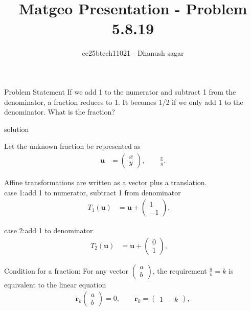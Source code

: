\documentclass{beamer}
\title{Matgeo Presentation - Problem 5.8.19}
\author{ee25btech11021 - Dhanush sagar}
\numberwithin{equation}{section}
\theoremstyle{remark}
\newcommand{\myvec}[1]{\ensuremath{\begin{pmatrix}#1\end{pmatrix}}}
\let\vec\mathbf
\begin{document}
	

		




\begin{frame}
  \titlepage
\end{frame}

\begin{frame}{Problem Statement}
If we add 1 to the numerator and subtract 1 from the denominator, a fraction reduces
to 1. It becomes 1/2 if we only add 1 to the denominator. What is the fraction?
\end{frame}

\begin{frame}{solution}

Let the unknown fraction be represented as
\begin{align}
\vec{u} &= \myvec{x \\ y}, \qquad 
\frac{x}{y}.
\end{align}

Affine transformations are written as a vector plus a translation.\\

case 1:add 1 to numerator, subtract 1 from denominator
\begin{align}
T_1(\vec{u}) &= \vec{u} + \myvec{1 \\ -1}, \quad 
\end{align}

case 2:add 1 to denominator
\begin{align}
T_2(\vec{u}) &= \vec{u} + \myvec{0 \\ 1}, \quad
\end{align}

Condition for a fraction:  
For any vector $\myvec{a \\ b}$, the requirement $\tfrac{a}{b}=k$ is equivalent to the linear equation
\begin{align}
\vec{r}_k \myvec{a \\ b} = 0, 
\qquad \vec{r}_k = \myvec{1 & -k},
\end{align}
\end{frame}
\end{document}
